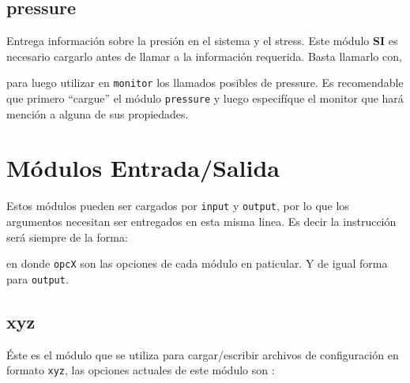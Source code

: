 \subsection{pressure}

Entrega informaci\'on sobre la presi\'on en el sistema y el stress. Este m\'odulo \textbf{SI} es necesario cargarlo antes de llamar a la informaci\'on requerida. Basta llamarlo con,


para luego utilizar en \verb|monitor| los llamados posibles de pressure. Es recomendable que primero ``cargue'' el m\'odulo \verb|pressure| y luego especif\'ique el monitor que har\'a menci\'on a alguna de sus propiedades.


\section{M\'odulos Entrada/Salida}
\label{chap:modulos:entradasalida}
Estos m\'odulos pueden ser cargados por \verb|input| y \verb|output|, por lo que los argumentos necesitan ser entregados en esta misma linea. Es decir la instrucci\'on ser\'a siempre de la forma:


en donde \verb|opcX| son las opciones de cada m\'odulo en paticular. Y de igual forma para \verb|output|.

\subsection{xyz}
\'Este es el m\'odulo que se utiliza para cargar/escribir archivos de configuraci\'on en formato \verb|xyz|, las opciones actuales de este m\'odulo son :


